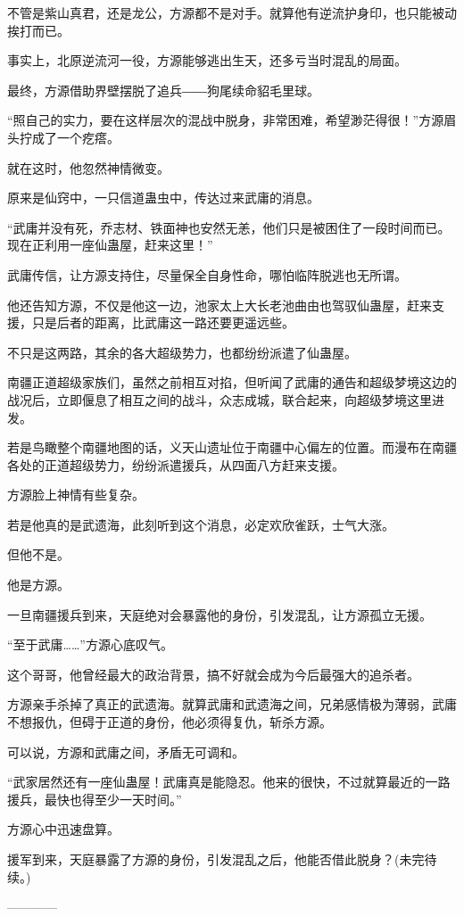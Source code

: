 \begin{this_body}
不管是紫山真君，还是龙公，方源都不是对手。就算他有逆流护身印，也只能被动挨打而已。

事实上，北原逆流河一役，方源能够逃出生天，还多亏当时混乱的局面。

最终，方源借助界壁摆脱了追兵――狗尾续命貂毛里球。

“照自己的实力，要在这样层次的混战中脱身，非常困难，希望渺茫得很！”方源眉头拧成了一个疙瘩。

就在这时，他忽然神情微变。

原来是仙窍中，一只信道蛊虫中，传达过来武庸的消息。

“武庸并没有死，乔志材、铁面神也安然无恙，他们只是被困住了一段时间而已。现在正利用一座仙蛊屋，赶来这里！”

武庸传信，让方源支持住，尽量保全自身性命，哪怕临阵脱逃也无所谓。

他还告知方源，不仅是他这一边，池家太上大长老池曲由也驾驭仙蛊屋，赶来支援，只是后者的距离，比武庸这一路还要更遥远些。

不只是这两路，其余的各大超级势力，也都纷纷派遣了仙蛊屋。

南疆正道超级家族们，虽然之前相互对掐，但听闻了武庸的通告和超级梦境这边的战况后，立即偃息了相互之间的战斗，众志成城，联合起来，向超级梦境这里进发。

若是鸟瞰整个南疆地图的话，义天山遗址位于南疆中心偏左的位置。而漫布在南疆各处的正道超级势力，纷纷派遣援兵，从四面八方赶来支援。

方源脸上神情有些复杂。

若是他真的是武遗海，此刻听到这个消息，必定欢欣雀跃，士气大涨。

但他不是。

他是方源。

一旦南疆援兵到来，天庭绝对会暴露他的身份，引发混乱，让方源孤立无援。

“至于武庸……”方源心底叹气。

这个哥哥，他曾经最大的政治背景，搞不好就会成为今后最强大的追杀者。

方源亲手杀掉了真正的武遗海。就算武庸和武遗海之间，兄弟感情极为薄弱，武庸不想报仇，但碍于正道的身份，他必须得复仇，斩杀方源。

可以说，方源和武庸之间，矛盾无可调和。

“武家居然还有一座仙蛊屋！武庸真是能隐忍。他来的很快，不过就算最近的一路援兵，最快也得至少一天时间。”

方源心中迅速盘算。

援军到来，天庭暴露了方源的身份，引发混乱之后，他能否借此脱身？(未完待续。)

------------

\end{this_body}

